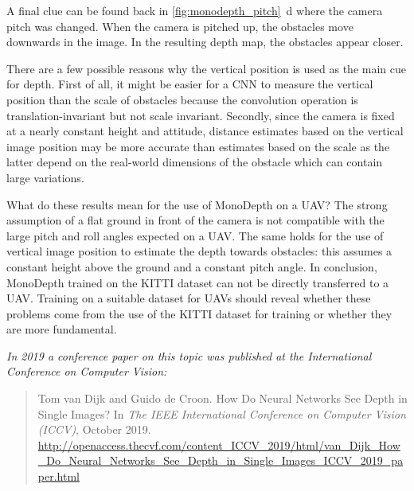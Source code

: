 A final clue can be found back in \autoref{fig:monodepth_pitch}~d where the camera pitch was changed.
When the camera is pitched up, the obstacles move downwards in the image.
In the resulting depth map, the obstacles appear closer.

There are a few possible reasons why the vertical position is used as the main cue for depth.
First of all, it might be easier for a \ac{CNN} to measure the vertical position than the scale of obstacles because the convolution operation is translation-invariant but not scale invariant.
Secondly, since the camera is fixed at a nearly constant height and attitude, distance estimates based on the vertical image position may be more accurate than estimates based on the scale as the latter depend on the real-world dimensions of the obstacle which can contain large variations.

\medskip

What do these results mean for the use of MonoDepth on a \ac{UAV}?
The strong assumption of a flat ground in front of the camera is not compatible with the large pitch and roll angles expected on a \ac{UAV}.
The same holds for the use of vertical image position to estimate the depth towards obstacles: this assumes a constant height above the ground and a constant pitch angle.
In conclusion, MonoDepth trained on the KITTI dataset can not be directly transferred to a \ac{UAV}.
Training on a suitable dataset for \acp{UAV} should reveal whether these problems come from the use of the KITTI dataset for training or whether they are more fundamental.

\medskip

\noindent
\emph{In 2019 a conference paper on this topic was published at the International Conference on Computer Vision:}\nocite{Dijk2019}

\begin{quote}
Tom van Dijk and Guido de Croon.  How Do Neural Networks See Depth in Single Images? In \emph{The IEEE International Conference on Computer Vision (ICCV)}, October 2019. \url{http://openaccess.thecvf.com/content_ICCV_2019/html/van_Dijk_How_Do_Neural_Networks_See_Depth_in_Single_Images_ICCV_2019_paper.html}
\end{quote}